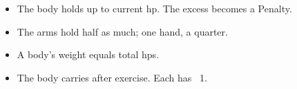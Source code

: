 \begin{itemize}
  \item
  The body holds  up to current \gls{hp}.
  The excess becomes a Penalty.
  \item
  The arms hold half as much; one hand, a quarter.
  \item
  A body's \gls{weight} equals total \glspl{hp}.
  \item
  The body carries  after exercise.
  Each has ~1.
\end{itemize}
